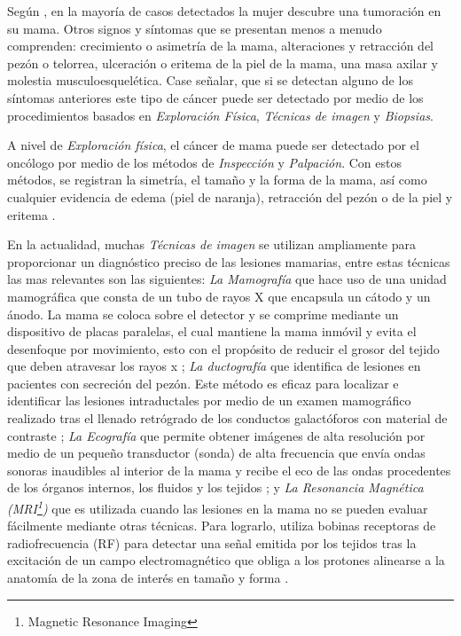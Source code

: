 Según \citep{Brunicardi2010}, en la mayoría de casos detectados la mujer descubre una tumoración en su mama. Otros signos y síntomas que se presentan menos a menudo comprenden: crecimiento o asimetría de la mama, alteraciones y retracción del pezón o telorrea, ulceración o eritema de la piel de la mama, una masa axilar y molestia musculoesquelética. Case señalar, que si se detectan alguno de los síntomas anteriores este tipo de cáncer puede ser detectado por medio de los procedimientos basados en \textit{Exploración Física}, \textit{Técnicas de imagen} y \textit{Biopsias}. 

A nivel de \textit{Exploración física}, el cáncer de mama puede ser detectado por el oncólogo por medio de los métodos de \textit{Inspección} y \textit{Palpación}. Con estos métodos, se registran la simetría, el tamaño y la forma de la mama, así como cualquier evidencia de edema (piel de naranja), retracción del pezón o de la piel y eritema \citep{Brunicardi2010}.

En la actualidad, muchas \textit{Técnicas de imagen} se utilizan ampliamente para proporcionar un diagnóstico preciso de las lesiones mamarias\citep{Tamam2021}, entre estas técnicas las mas relevantes son las siguientes: \textit{La Mamografía} que hace uso de una unidad mamográfica que consta de un tubo de rayos X que encapsula un cátodo y un ánodo. La mama se coloca sobre el detector y se comprime mediante un dispositivo de placas paralelas, el cual mantiene la mama inmóvil y evita el desenfoque por movimiento, esto con el propósito de reducir el grosor del tejido que deben atravesar los rayos x \citep{Ebrahimi2019}; \textit{La ductografía} que identifica de lesiones en pacientes con secreción del pezón. Este método es eficaz para localizar e identificar las lesiones intraductales por medio de un examen mamográfico realizado tras el llenado retrógrado de los conductos galactóforos con material de contraste \citep{Hirose2007}; \textit{La Ecografía} que permite obtener imágenes de alta resolución por medio de un pequeño transductor (sonda) de alta frecuencia que envía ondas sonoras inaudibles al interior de la mama y recibe el eco de las ondas procedentes de los órganos internos, los fluidos y los tejidos \citep{Hasan2019}; y \textit{La Resonancia Magnética (MRI\footnote{Magnetic Resonance Imaging}) }que es utilizada cuando las lesiones en la mama no se pueden evaluar fácilmente mediante otras técnicas. Para lograrlo, utiliza bobinas receptoras de radiofrecuencia (RF) para detectar una señal emitida por los tejidos tras la excitación de un campo electromagnético que obliga a los protones alinearse a la anatomía de la zona de interés en tamaño y forma \citep{Tse2014}.

